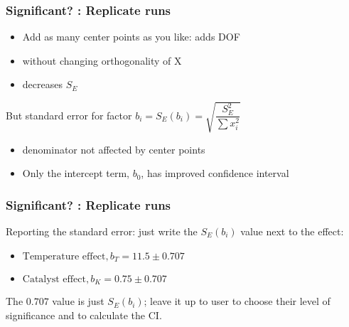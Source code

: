 \begin{frame}\frametitle{Significant? : Replicate runs}
	\begin{itemize}
		\item	Add as many center points as you like: adds DOF
		\item	without changing orthogonality of $\mathrm{X}$
		\item	decreases $S_E$
	\end{itemize}

	But standard error for factor $b_i = S_E(b_i) = \sqrt{\dfrac{S_E^2}{\sum{x_i^2}}}$
	\begin{itemize}
		\item	denominator not affected by center points
		\item	Only the intercept term, $b_0$, has improved confidence interval
	\end{itemize}
\end{frame}

\begin{frame}\frametitle{Significant? : Replicate runs}

	Reporting the standard error: just write the $S_E(b_i)$ value next to the effect:
	\begin{itemize}
		\item	$\text{Temperature effect}, b_T = 11.5 \pm 0.707$
		\item	$\text{Catalyst effect}, b_K = 0.75 \pm 0.707$
	\end{itemize}

	The $0.707$ value is just $S_E(b_i)$; leave it up to user to choose their level of significance and to calculate the CI.
\end{frame}

